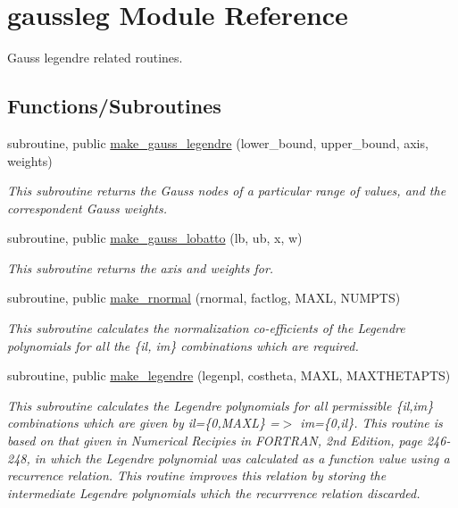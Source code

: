 \hypertarget{namespacegaussleg}{}\section{gaussleg Module Reference}
\label{namespacegaussleg}


Gauss legendre related routines.  


\subsection*{Functions/\+Subroutines}
\begin{DoxyCompactItemize}
\item 
subroutine, public \mbox{\hyperlink{namespacegaussleg_a03137cc32f867e636184d46d71c1a6e5}{make\+\_\+gauss\+\_\+legendre}} (lower\+\_\+bound, upper\+\_\+bound, axis, weights)
\begin{DoxyCompactList}\small\item\em This subroutine returns the Gauss nodes of a particular range of values, and the correspondent Gauss weights. \end{DoxyCompactList}\item 
subroutine, public \mbox{\hyperlink{namespacegaussleg_ae13f295f37c8f2b482df2dabe29d7efa}{make\+\_\+gauss\+\_\+lobatto}} (lb, ub, x, w)
\begin{DoxyCompactList}\small\item\em This subroutine returns the axis and weights for. \end{DoxyCompactList}\item 
subroutine, public \mbox{\hyperlink{namespacegaussleg_abe9f1fb10770b5231c05a8ea76f208b5}{make\+\_\+rnormal}} (rnormal, factlog, M\+A\+XL, N\+U\+M\+P\+TS)
\begin{DoxyCompactList}\small\item\em This subroutine calculates the normalization co-\/efficients of the Legendre polynomials for all the \{il, im\} combinations which are required. \end{DoxyCompactList}\item 
subroutine, public \mbox{\hyperlink{namespacegaussleg_adf5fcb0267401d6480e597f82a096c93}{make\+\_\+legendre}} (legenpl, costheta, M\+A\+XL, M\+A\+X\+T\+H\+E\+T\+A\+P\+TS)
\begin{DoxyCompactList}\small\item\em This subroutine calculates the Legendre polynomials for all permissible \{il,im\} combinations which are given by il=\{0,M\+A\+XL\} =$>$ im=\{0,il\}. This routine is based on that given in Numerical Recipies in F\+O\+R\+T\+R\+AN, 2nd Edition, page 246-\/248, in which the Legendre polynomial was calculated as a function value using a recurrence relation. This routine improves this relation by storing the intermediate Legendre polynomials which the recurrrence relation discarded. \end{DoxyCompactList}\item 

\end{DoxyCompactItemize}
